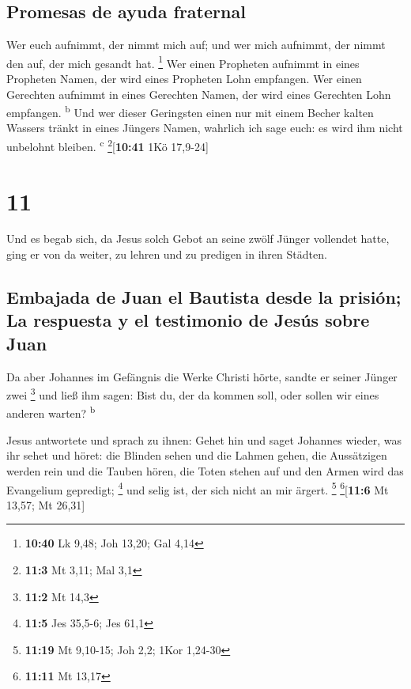 \hypertarget{promesas-de-ayuda-fraternal}{%
\subsection{Promesas de ayuda
fraternal}\label{promesas-de-ayuda-fraternal}}

 Wer euch aufnimmt, der nimmt mich auf; und wer mich
aufnimmt, der nimmt den auf, der mich gesandt hat. \footnote{\textbf{10:40}
  Lk 9,48; Joh 13,20; Gal 4,14}  Wer einen Propheten
aufnimmt in eines Propheten Namen, der wird eines Propheten Lohn
empfangen. Wer einen Gerechten aufnimmt in eines Gerechten Namen, der
wird eines Gerechten Lohn empfangen. \textsuperscript{b} 
Und wer dieser Geringsten einen nur mit einem Becher kalten Wassers
tränkt in eines Jüngers Namen, wahrlich ich sage euch: es wird ihm nicht
unbelohnt bleiben. \textsuperscript{c} \footnote{\textbf{11:3} Mt 3,11;
  Mal 3,1}{[}\textbf{10:41} 1Kö 17,9-24{]}

\hypertarget{section-10}{%
\section{11}\label{section-10}}

 Und es begab sich, da Jesus solch Gebot an seine zwölf
Jünger vollendet hatte, ging er von da weiter, zu lehren und zu predigen
in ihren Städten.

\hypertarget{embajada-de-juan-el-bautista-desde-la-prisiuxf3n-la-respuesta-y-el-testimonio-de-jesuxfas-sobre-juan}{%
\subsection{Embajada de Juan el Bautista desde la prisión; La respuesta
y el testimonio de Jesús sobre
Juan}\label{embajada-de-juan-el-bautista-desde-la-prisiuxf3n-la-respuesta-y-el-testimonio-de-jesuxfas-sobre-juan}}

 Da aber Johannes im Gefängnis die Werke Christi hörte,
sandte er seiner Jünger zwei \footnote{\textbf{11:2} Mt 14,3}
 und ließ ihm sagen: Bist du, der da kommen soll, oder
sollen wir eines anderen warten? \textsuperscript{b}

 Jesus antwortete und sprach zu ihnen: Gehet hin und saget
Johannes wieder, was ihr sehet und höret:  die Blinden
sehen und die Lahmen gehen, die Aussätzigen werden rein und die Tauben
hören, die Toten stehen auf und den Armen wird das Evangelium gepredigt;
\footnote{\textbf{11:5} Jes 35,5-6; Jes 61,1}  und selig
ist, der sich nicht an mir ärgert. \footnote{\textbf{11:19} Mt 9,10-15;
  Joh 2,2; 1Kor 1,24-30} \footnote{\textbf{11:11} Mt 13,17}{[}\textbf{11:6}
Mt 13,57; Mt 26,31{]}

